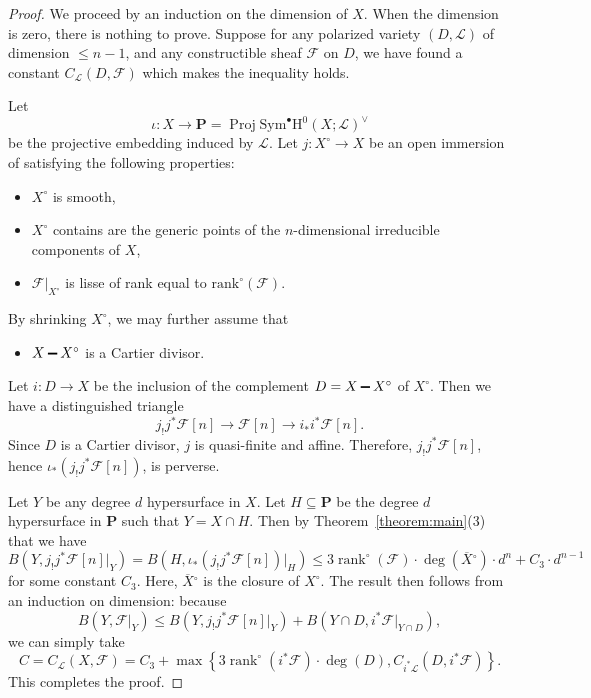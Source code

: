 \documentclass[english]{smfart}
\renewcommand{\setminus}{\mathbin{\rule[0.2em]{0.67em}{0.12em}}}%
\renewcommand{\mathbb}{\mathbf}
\renewcommand{\leq}{\leqslant}
\renewcommand{\subset}{\subseteq}
\theoremstyle{remark}
\theoremstyle{plain}
\theoremstyle{definition}
\numberwithin{equation}{remark}
\theoremstyle{void}
\begin{document}
\begin{proof}
We proceed by an induction on the dimension of \(X\).  When the
dimension is zero, there is nothing to prove.  Suppose for any polarized variety
\((D,\mathscr{L})\) of dimension \(\leq n-1\), and any constructible sheaf \(\mathcal{F}\)
on \(D\), we have found a constant \(C_{\mathscr{L}}(D,\mathcal{F})\) which makes
the inequality holds.

Let
\[
\iota\colon X \to \mathbb{P} = \operatorname{Proj}\mathrm{Sym}^{\bullet}\mathrm{H}^0(X;\mathscr{L})^{\vee}
\]
be the projective embedding induced by \(\mathscr{L}\).  Let
\(j\colon X^{\circ} \to X\) be an open immersion of satisfying the
following properties:
\begin{itemize}
\item \(X^{\circ}\) is smooth,
\item \(X^{\circ}\) contains are the generic points of the
\(n\)-dimensional irreducible components of \(X\),
\item \(\mathcal{F}|_{X^{\circ}}\) is lisse of rank equal to
\(\mathrm{rank}^{\circ}(\mathcal{F})\).
\end{itemize}
By shrinking \(X^{\circ}\), we may further assume that
\begin{itemize}
\item \(X \setminus X^{\circ}\) is a Cartier divisor.
\end{itemize}
Let \(i \colon D \to X\) be the inclusion of
the complement \(D = X \setminus X^{\circ}\) of \(X^{\circ}\).  Then
we have a distinguished triangle
\[
j_! j^{\ast}\mathcal{F}[n] \to \mathcal{F}[n] \to i_{\ast} i^{\ast} \mathcal{F}[n].
\]
Since \(D\) is a Cartier divisor, \(j\) is quasi-finite and affine.
Therefore, \(j_!j^{\ast}\mathcal{F}[n]\), hence \(\iota_{\ast} (j_!j^{\ast}\mathcal{F}[n])\), is perverse.

Let \(Y\) be any degree \(d\) hypersurface in \(X\).
Let \(H \subset \mathbb{P}\) be the degree \(d\) hypersurface in \(\mathbb{P}\) such that \(Y = X \cap H\).
Then by
Theorem~\ref{theorem:main}(3) that we have
\[
B(Y, j_!j^{\ast}\mathcal{F}[n]|_Y) = B(H, \iota_{\ast} (j_!j^{\ast}\mathcal{F}[n])|_{H})
\leq 3\operatorname{rank}^{\circ}(\mathcal{F}) \cdot \deg(\overline{X}{}^{\circ})
\cdot d^n + C_3 \cdot d^{n-1}
\]
for some constant \(C_3\).  Here, \(\overline{X}{}^{\circ}\) is the
closure of \(X^{\circ}\).  The result then follows from an induction
on dimension: because
\[
B(Y, \mathcal{F}|_{Y}) \leq B(Y, j_!j^{\ast}\mathcal{F}[n]|_Y) + B(Y \cap D, i^{\ast} \mathcal{F}|_{Y\cap D}),
\]
we can simply take
\[
C = C_{\mathscr{L}}(X,\mathcal{F})=C_{3} + \max\left\{3\operatorname{rank}^{\circ}(i^{\ast}\mathcal{F})\cdot \deg(D), C_{i^{\ast}\mathscr{L}}(D,i^{\ast}\mathcal{F})\right\}.
\]
This completes the proof.
\end{proof}
\end{document}
